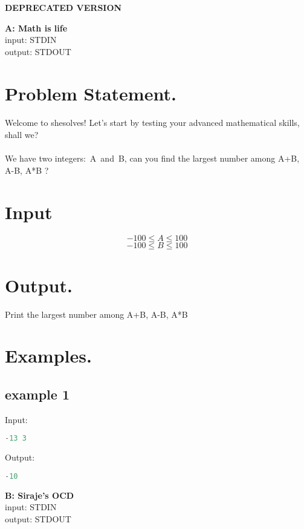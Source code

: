 \documentclass[10pt]{article}
\begin{document}
    \Huge { \textbf{DEPRECATED VERSION}}\\

\begin{center}
    \Huge { \textbf{A: Math is life}}\\
    \normalsize  { input:  STDIN}\\
    \normalsize{    output: STDOUT}
\end{center}
\section{Problem Statement.}
\paragraph{}
Welcome to shesolves!
Let’s start by testing your advanced mathematical skills, shall we?
\paragraph{}
We have two integers: A and B, can you find the largest number among A+B, A-B, A*B ?
\paragraph{}
\section{Input}
$$ -100\le A \le 100 $$
$$ -100\le B \le 100 $$
\section{Output.}
Print the largest number among A+B, A-B, A*B
\section{Examples.}
\subsection{example 1}
Input:
\begin{lstlisting}[language=Python]
-13 3
\end{lstlisting}
Output:
\begin{lstlisting}[language=Python]
-10
\end{lstlisting}
\newpage
\begin{center}
    \Huge{    \textbf{B: Siraje's OCD}}\\
        \normalsize  { input:  STDIN}\\
    \normalsize{    output: STDOUT}
\end{center}
\end{document}
